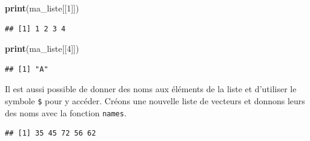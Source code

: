 \documentclass[
  11pt,
  french,
]{book}
\makeatletter
\newenvironment{Shaded}{\begin{snugshade}}{\end{snugshade}}
\newcommand{\DecValTok}[1]{\textcolor[rgb]{0.00,0.00,0.81}{#1}}
\newcommand{\FloatTok}[1]{\textcolor[rgb]{0.00,0.00,0.81}{#1}}
\newcommand{\KeywordTok}[1]{\textcolor[rgb]{0.13,0.29,0.53}{\textbf{#1}}}
\newcommand{\NormalTok}[1]{#1}
\newcommand{\OperatorTok}[1]{\textcolor[rgb]{0.81,0.36,0.00}{\textbf{#1}}}
\newcommand{\OtherTok}[1]{\textcolor[rgb]{0.56,0.35,0.01}{#1}}
\newcommand{\StringTok}[1]{\textcolor[rgb]{0.31,0.60,0.02}{#1}}
\newenvironment{kframe}{%
\medskip{}
\setlength{\fboxsep}{.8em}
 \def\at@end@of@kframe{}%
 \ifinner\ifhmode%
  \def\at@end@of@kframe{\end{minipage}}%
  \begin{minipage}{\columnwidth}%
 \fi\fi%
 \def\FrameCommand##1{\hskip\@totalleftmargin \hskip-\fboxsep
 \colorbox{shadecolor}{##1}\hskip-\fboxsep
     \hskip-\linewidth \hskip-\@totalleftmargin \hskip\columnwidth}%
 \MakeFramed {\advance\hsize-\width
   \@totalleftmargin\z@ \linewidth\hsize
   \@setminipage}}%
 {\par\unskip\endMakeFramed%
 \at@end@of@kframe}
\renewenvironment{Shaded}{\begin{kframe}}{\end{kframe}}
\makeatother
\begin{document}
\begin{Shaded}
\begin{Highlighting}[]
\KeywordTok{print}\NormalTok{(ma_liste[[}\DecValTok{1}\NormalTok{]])}
\end{Highlighting}
\end{Shaded}

\begin{verbatim}
## [1] 1 2 3 4
\end{verbatim}

\begin{Shaded}
\begin{Highlighting}[]
\KeywordTok{print}\NormalTok{(ma_liste[[}\DecValTok{4}\NormalTok{]])}
\end{Highlighting}
\end{Shaded}

\begin{verbatim}
## [1] "A"
\end{verbatim}

Il est aussi possible de donner des noms aux éléments de la liste et d'utiliser le symbole \texttt{\$} pour y accéder. Créons une nouvelle liste de vecteurs et donnons leurs des noms avec la fonction \texttt{names}.

\begin{Shaded}
\end{Shaded}

\begin{verbatim}
## [1] 35 45 72 56 62
\end{verbatim}
\end{document}
